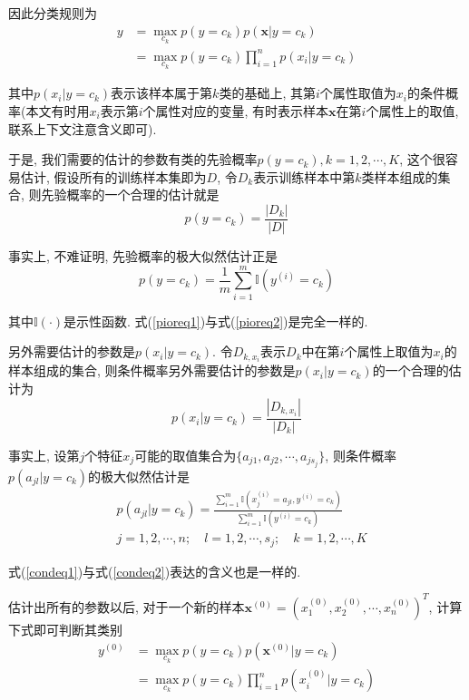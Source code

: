 \documentclass[a4paper,UTF8]{ctexart}
\theoremstyle{plain} \newtheorem{theorem}{定理}[section]
\theoremstyle{plain} \newtheorem{definition}{定义}[section]
\theoremstyle{plain} \newtheorem{lemma}{引理}[section]
\theoremstyle{plain} \newtheorem{proposition}{命题}[section]
\theoremstyle{plain} \newtheorem{example}{例}[section]
\theoremstyle{plain} \newtheorem{remark}{注}[section]
\theoremstyle{plain} \newtheorem{corollary}{推论}[section]
\begin{document}
因此分类规则为
\begin{align*}
y & = \max_{c_k} p(y = c_k) p(\bm{x} | y = c_k) \\ 
& = \max_{c_k} p(y = c_k) \prod_{i=1}^{n} p(x_i | y = c_k)
\end{align*}

其中$p(x_i | y = c_k)$表示该样本属于第$k$类的基础上, 其第$i$个属性取值为$x_i$的条件概率(本文有时用$x_i$表示第$i$个属性对应的变量, 有时表示样本$\bm{x}$在第$i$个属性上的取值, 联系上下文注意含义即可).

于是, 我们需要的估计的参数有类的先验概率$p(y = c_{k}), k=1,2,\cdots,K$, 这个很容易估计, 假设所有的训练样本集即为$D$, 令$D_{k}$表示训练样本中第$k$类样本组成的集合, 则先验概率的一个合理的估计就是
\begin{equation}\label{pioreq1}
p(y = c_k) = \frac{|D_k|}{|D|}
\end{equation}

事实上, 不难证明, 先验概率的极大似然估计正是
\begin{equation}\label{pioreq2}
p(y = c_k) = \frac{1}{m} \sum_{i=1}^{m} \mathbb{I}(y^{(i)} = c_k)
\end{equation}

其中$\mathbb{I}(\cdot)$是示性函数. 式(\ref{pioreq1})与式(\ref{pioreq2})是完全一样的.

另外需要估计的参数是$p(x_i | y = c_k)$. 令$D_{k, x_i}$表示$D_{k}$中在第$i$个属性上取值为$x_i$的样本组成的集合, 则条件概率另外需要估计的参数是$p(x_i | y = c_k)$的一个合理的估计为
\begin{equation}\label{condeq1}
p(x_i | y = c_k) = \frac{|D_{k, x_i}|}{|D_k|}
\end{equation}

事实上, 设第$j$个特征$x_j$可能的取值集合为$\{a_{j1}, a_{j2}, \cdots, a_{j s_j}\}$, 则条件概率$p(a_{jl} | y = c_k)$的极大似然估计是
\begin{equation}\label{condeq2}
\begin{split}
& p(a_{jl} | y = c_k) = \frac{\sum_{i=1}^{m} \mathbb{I}(x_{j}^{(i)} = a_{jl}, y^{(i)} = c_k)}{\sum_{i=1}^{m} \mathbb{I}(y^{(i)} = c_k)} \\ 
& j = 1,2,\cdots,n; \quad l = 1,2,\cdots,s_{j}; \quad k=1,2,\cdots,K
\end{split}
\end{equation}

式(\ref{condeq1})与式(\ref{condeq2})表达的含义也是一样的.

估计出所有的参数以后, 对于一个新的样本$\bm{x}^{(0)} = (x_{1}^{(0)}, x_{2}^{(0)}, \cdots, x_{n}^{(0)})^{T}$, 计算下式即可判断其类别
\begin{align*}
y^{(0)} & = \max_{c_k} p(y = c_k) p(\bm{x}^{(0)} | y = c_k) \\ 
& = \max_{c_k} p(y = c_k) \prod_{i=1}^{n} p(x_{i}^{(0)} | y = c_k)
\end{align*}
\end{document}
